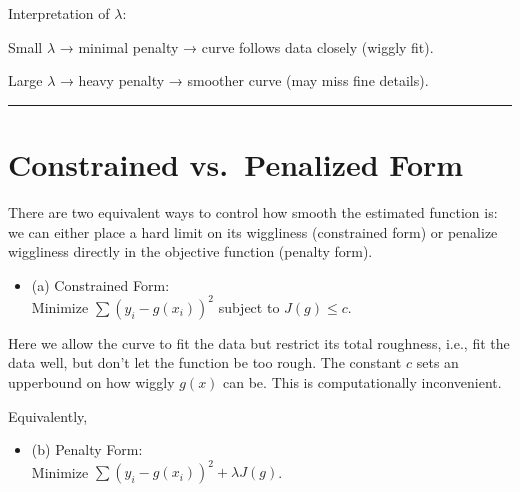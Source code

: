 \documentclass[
  letterpaper,
  DIV=11,
  numbers=noendperiod]{scrreprt}
\providecommand{\tightlist}{%
  \setlength{\itemsep}{0pt}\setlength{\parskip}{0pt}}\usepackage{longtable,booktabs,array}
\begin{document}
\begin{tcolorbox}[enhanced jigsaw, breakable, colbacktitle=quarto-callout-note-color!10!white, left=2mm, colframe=quarto-callout-note-color-frame, opacityback=0, coltitle=black, colback=white, rightrule=.15mm, title=\textcolor{quarto-callout-note-color}{\faInfo}\hspace{0.5em}{Note}, titlerule=0mm, opacitybacktitle=0.6, leftrule=.75mm, toprule=.15mm, arc=.35mm, bottomtitle=1mm, toptitle=1mm, bottomrule=.15mm]

Interpretation of \(\lambda\):

Small \(\lambda\) → minimal penalty → curve follows data closely (wiggly
fit).

Large \(\lambda\) → heavy penalty → smoother curve (may miss fine
details).

\end{tcolorbox}

\begin{center}\rule{0.5\linewidth}{0.5pt}\end{center}

\hypertarget{constrained-vs.-penalized-form}{%
\section*{Constrained vs.~Penalized
Form}\label{constrained-vs.-penalized-form}}


There are two equivalent ways to control how smooth the estimated
function is: we can either place a hard limit on its wiggliness
(constrained form) or penalize wiggliness directly in the objective
function (penalty form).

\begin{itemize}
\tightlist
\item
  (a) Constrained Form:\\
  Minimize \(\sum (y_i - g(x_i))^2\) subject to \(J(g) \leq c\).
\end{itemize}

Here we allow the curve to fit the data but restrict its total
roughness, i.e., fit the data well, but don't let the function be too
rough. The constant \(c\) sets an upperbound on how wiggly \(g(x)\) can
be. This is computationally inconvenient.

Equivalently,

\begin{itemize}
\tightlist
\item
  (b) Penalty Form:\\
  Minimize \(\sum (y_i - g(x_i))^2 + \lambda J(g)\).
\end{itemize}
\end{document}
